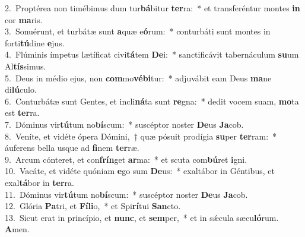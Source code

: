 {2.~}Proptérea non timébimus dum tur\textbf{bá}bitur \textbf{ter}ra:~* et transferéntur montes \textbf{in} cor \textbf{ma}ris.\\
{3.~}Sonuérunt, et turbátæ sunt \textbf{a}quæ e\textbf{ó}rum:~* conturbáti sunt montes in forti\textbf{tú}dine \textbf{e}jus.\\
{4.~}Flúminis ímpetus lætíficat civi\textbf{tá}tem \textbf{De}i:~* sanctificávit tabernáculum \textbf{su}um Al\textbf{tís}simus.\\
{5.~}Deus in médio ejus, non \textbf{com}mo\textbf{vé}\textbf{bi}tur:~* adjuvábit eam Deus \textbf{ma}ne di\textbf{lú}culo.\\
{6.~}Conturbátæ sunt Gentes, et incli\textbf{ná}ta sunt \textbf{re}gna:~* dedit vocem suam, \textbf{mo}ta est \textbf{ter}ra.\\
{7.~}Dóminus vir\textbf{tú}tum no\textbf{bí}scum:~* suscéptor noster \textbf{De}us \textbf{Ja}cob.\\
{8.~}Veníte, et vidéte ópera Dómini,~† quæ pósuit prodígia \textbf{su}per \textbf{ter}ram:~* áuferens bella usque ad \textbf{fi}nem \textbf{ter}ræ.\\
{9.~}Arcum cónteret, et con\textbf{frín}get \textbf{ar}ma:~* et scuta com\textbf{bú}ret \textbf{i}gni.\\
{10.~}Vacáte, et vidéte quóniam \textbf{e}go sum \textbf{De}us:~* exaltábor in Géntibus, et exal\textbf{tá}bor in \textbf{ter}ra.\\
{11.~}Dóminus vir\textbf{tú}tum no\textbf{bí}scum:~* suscéptor noster \textbf{De}us \textbf{Ja}cob.\\
{12.~}Glória \textbf{Pa}tri, et \textbf{Fí}\textbf{li}o,~* et Spi\textbf{rí}tui \textbf{San}cto.\\
{13.~}Sicut erat in princípio, et \textbf{nunc}, et \textbf{sem}per,~* et in sǽcula sæcu\textbf{ló}rum. \textbf{A}men.\\
